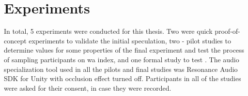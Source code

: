 


\chapter{Experiments}


In total, 5 experiments were conducted for this thesis. Two were quick proof-of-concept experiments to validate the initial speculation, two - pilot studies to determine values for some properties of the final experiment and test the process of sampling participants on \gls{wa} index, and one formal study to test . 
The audio specialization tool used in all the pilots and final studies was Resonance Audio SDK for Unity with occlusion effect turned off.
Participants in all of the studies were asked for their consent, in case they were recorded.


